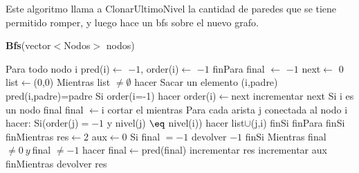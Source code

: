 \documentclass[spanish,12pt]{article}
\begin{document}
Este algoritmo llama a ClonarUltimoNivel la cantidad de paredes que se tiene permitido romper, y luego hace un bfs sobre el nuevo grafo.


\begin{algorithm}[H]{\textbf{Bfs}(vector$<$Nodos$>$ nodos)}
	\begin{algorithmic}[1]
		\State \quad Para todo nodo i
			\State \quad \quad  pred(i)$\gets$ $-1$, order(i)$\gets$ $-1$
		\State \quad finPara
		\State \quad final $\gets$ $-1$
		\State \quad next$\gets$ 0
		\State \quad list$\gets${(0,0)}
		\State \quad Mientras list $\neq \emptyset$ hacer
			\State \quad \quad Sacar un elemento (i,padre)
			\State \quad \quad pred(i,padre)=padre
			\State \quad \quad Si order(i=-1) hacer
				\State \quad \quad \quad order(i)$\gets$next
				\State \quad \quad \quad incrementar next
				\State \quad \quad \quad Si i es un nodo final
					\State \quad \quad \quad \quad final $\gets$i
					\State \quad \quad \quad \quad cortar el mientras
				\State \quad \quad \quad Para cada arista j conectada al nodo i hacer:
					\State \quad \quad \quad \quad Si(order(j)$=-1$ y nivel(j) $\eq$ nivel(i)) hacer
						 \State \quad \quad \quad \quad \quad list$\cup${(j,i)}
					\State \quad \quad \quad \quad finSi
				\State \quad \quad \quad   finPara
			\State \quad \quad  finSi
		\State \quad finMientras
		\State \quad res$\gets$2
		\State \quad aux$\gets$0
		\State \quad Si final $= -1$
		\State \quad \quad devolver $-1$
		\State \quad finSi		
		\State \quad Mientras  final $\neq 0 \ y \ $final $\neq -1 $ hacer
			\State \quad \quad  final$\gets$pred(final)
			\State \quad \quad incrementar res
			\State \quad \quad incrementar aux
		\State \quad finMientras
		\State \quad devolver res
		
	\end{algorithmic}
\end{algorithm}
\end{document}
